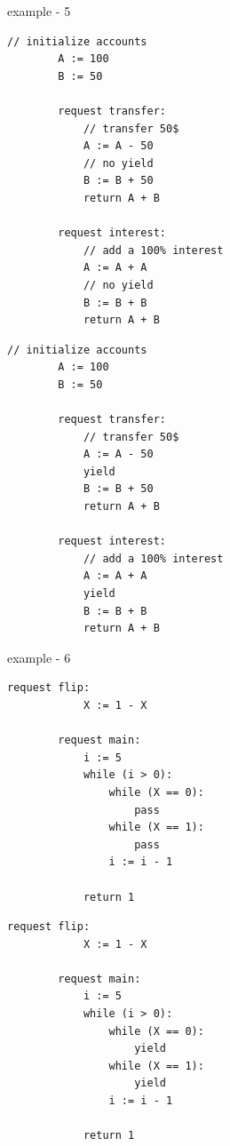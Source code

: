 

\newpage

example - 5

\noindent
\begin{minipage}[t]{0.45\textwidth}
	\begin{lstlisting}[caption={bank (serializable)}]
	    // initialize accounts
	    A := 100
	    B := 50
	    
	    request transfer: 
	        // transfer 50$
	        A := A - 50
	        // no yield
	        B := B + 50
	        return A + B
				
	    request interest: 
	        // add a 100% interest
	        A := A + A
	        // no yield
	        B := B + B
	        return A + B	      		        
			\end{lstlisting}
\end{minipage}
\hfill
\begin{minipage}[t]{0.45\textwidth}
	\begin{lstlisting}[caption={bank with yields (non serializable)}]
	    // initialize accounts
	    A := 100
	    B := 50
			
	    request transfer: 
	        // transfer 50$
	        A := A - 50
	        yield
	        B := B + 50
	        return A + B
	
	    request interest: 
	        // add a 100% interest
	        A := A + A
	        yield
	        B := B + B
	        return A + B	      		        
		\end{lstlisting}
\end{minipage}
	


example - 6


\noindent
\begin{minipage}[t]{0.45\textwidth}
	\begin{lstlisting}[caption={Complex while (serializable)}]
	    request flip: 
	        X := 1 - X 
	    
	    request main:
	        i := 5
	        while (i > 0):
	            while (X == 0):
	                pass
	            while (X == 1):
	                pass
	            i := i - 1
	        
	        return 1       
			\end{lstlisting}
\end{minipage}%
\hfill
\begin{minipage}[t]{0.45\textwidth}
	\begin{lstlisting}[caption={Complex while with yields (not serializable)}]
	    request flip: 
	        X := 1 - X 
	
	    request main:
	        i := 5
	        while (i > 0):
	            while (X == 0):
	                yield
	            while (X == 1):
	                yield
	            i := i - 1
	
	        return 1        
				\end{lstlisting}
\end{minipage}



